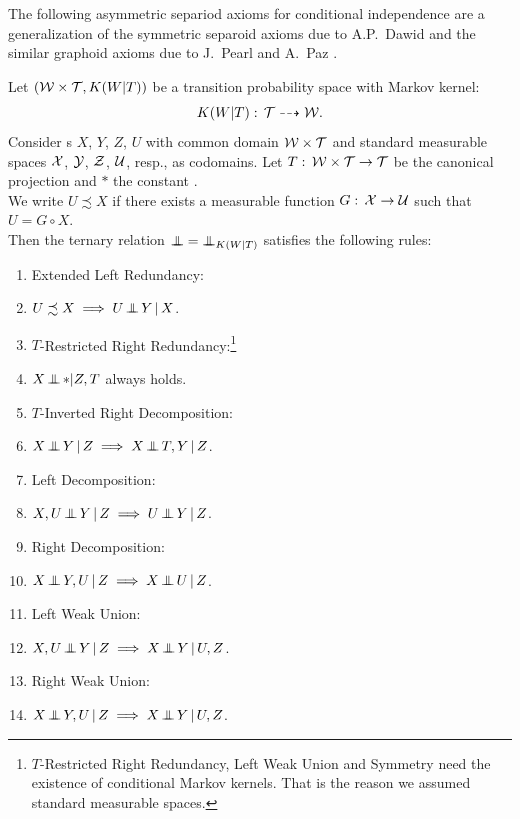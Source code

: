 The following asymmetric separiod axioms for conditional independence are a generalization of the symmetric separoid axioms due to A.P.~Dawid \cite{Daw01} and the similar graphoid axioms due to J.~Pearl and A.~Paz \cite{PP85}.
\begin{DefThm}
    \label{ci-separoid-axioms}
    Let $(\mathcal{W} \times \mathcal{T}, K(W|T))$ be a transition probability space with Markov kernel:
\[K(W|T): \, \mathcal{T} \dashrightarrow  \mathcal{W}.\]
Consider \trv{}s $X$, $Y$, $Z$, $U$ with common domain $\mathcal{W}\times \mathcal{T}$ and standard measurable spaces $\mathcal{X}$, 
$\mathcal{Y}$, $\mathcal{Z}$, $\mathcal{U}$, resp., as codomains.
Let $T:\, \mathcal{W} \times \mathcal{T} \to \mathcal{T}$ be the canonical projection and $\ast$ the constant \trv{}.\\
We write $U \precsim X$ if there exists a measurable function %
$G:\, \mathcal{X} \to \mathcal{U}$ 
such that $U = G \circ X$.\\
Then the ternary relation $\operatorname*{\perp\mkern-11mu\perp} = \operatorname*{\perp\mkern-11mu\perp}_{K(W|T)}$ satisfies the following rules:
\begin{enumerate}[label=\alph*)]
	\item Extended Left Redundancy: 
    \item[] $U \precsim X \implies U \operatorname*{\perp\mkern-11mu\perp}  Y \operatorname*{|} X$.
    \item $T$-Restricted Right Redundancy:\footnote{\label{fn:sep-ax-std} $T$-Restricted Right Redundancy, Left Weak Union and Symmetry need the existence of conditional Markov kernels. That is the reason we assumed standard measurable spaces.}
    \item[] $X\operatorname*{\perp\mkern-11mu\perp} \ast|Z,T$ always holds.
    \item $T$-Inverted Right Decomposition:
    \item[] $X \operatorname*{\perp\mkern-11mu\perp}  Y \operatorname*{|} Z \implies X \operatorname*{\perp\mkern-11mu\perp}  T, Y \operatorname*{|} Z$.
	\item Left Decomposition:  
	\item[]$X,U \operatorname*{\perp\mkern-11mu\perp}  Y \operatorname*{|} Z \implies U \operatorname*{\perp\mkern-11mu\perp}  Y \operatorname*{|} Z$.
  \item Right Decomposition:  	
    \item[] $X \operatorname*{\perp\mkern-11mu\perp}  Y,U \operatorname*{|} Z \implies X \operatorname*{\perp\mkern-11mu\perp}  U \operatorname*{|} Z$.
    \item Left Weak Union:
    \item[] $X , U \operatorname*{\perp\mkern-11mu\perp}  Y  \operatorname*{|} Z \implies X \operatorname*{\perp\mkern-11mu\perp}  Y \operatorname*{|} U , Z$.
  \item Right Weak Union:\item[] $X \operatorname*{\perp\mkern-11mu\perp}  Y , U \operatorname*{|} Z \implies X \operatorname*{\perp\mkern-11mu\perp}  Y \operatorname*{|} U , Z$.

\end{enumerate}
\end{DefThm}
